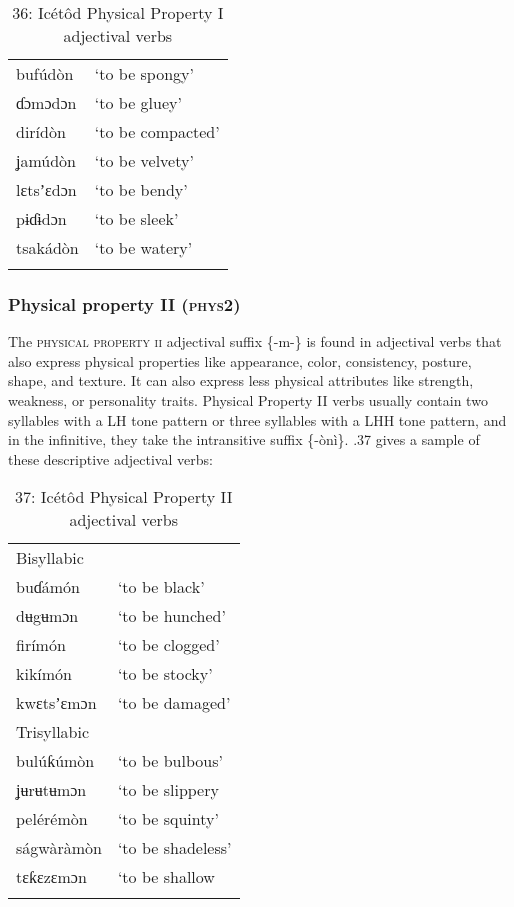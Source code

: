 \begin{table}
\caption{36: Icétôd Physical Property I adjectival verbs}
\label{tab:8}


\begin{tabularx}{\textwidth}{XX}
\lsptoprule

bufúdòn & ‘to be spongy’\\
ɗɔmɔdɔn & ‘to be gluey’\\
dirídòn & ‘to be compacted’\\
ʝamúdòn & ‘to be velvety’\\
lɛtsʼɛdɔn & ‘to be bendy’\\
pɨɗɨdɔn & ‘to be sleek’\\
tsakádòn & ‘to be watery’\\
\lspbottomrule
\end{tabularx}
\end{table}

\subsubsection{Physical property II (\textsc{phys2})}

The \textsc{physical property ii} adjectival suffix \{-m-\} is found in adjectival verbs that also express physical properties like appearance, color, consistency, posture, shape, and texture. It can also express less physical attributes like strength, weakness, or personality traits. Physical Property II verbs usually contain two syllables with a LH tone pattern or three syllables with a LHH tone pattern, and in the infinitive, they take the intransitive suffix \{-ònì\}. .37 gives a sample of these descriptive adjectival verbs:


\begin{table}
\caption{37: Icétôd Physical Property II adjectival verbs}
\label{tab:8}


\begin{tabularx}{\textwidth}{XX}
\lsptoprule

Bisyllabic & \\
buɗámón & ‘to be black’\\
dʉgʉmɔn & ‘to be hunched’\\
firímón & ‘to be clogged’\\
kikímón & ‘to be stocky’\\
kwɛtsʼɛmɔn & ‘to be damaged’\\
Trisyllabic & \\
bulúƙúmòn & ‘to be bulbous’\\
ʝʉrʉtʉmɔn & ‘to be slippery\\
pelérémòn & ‘to be squinty’\\
ságwàràmòn & ‘to be shadeless’\\
tɛƙɛzɛmɔn & ‘to be shallow\\
\lspbottomrule
\end{tabularx}
\end{table}

